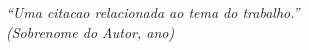
\begin{epigrafe}
  \vspace*{\fill}
  \begin{flushright}
    \textit{
      ``Uma citacao relacionada ao tema do trabalho.''\\
      (Sobrenome do Autor, ano)
    }
  \end{flushright}
\end{epigrafe}
